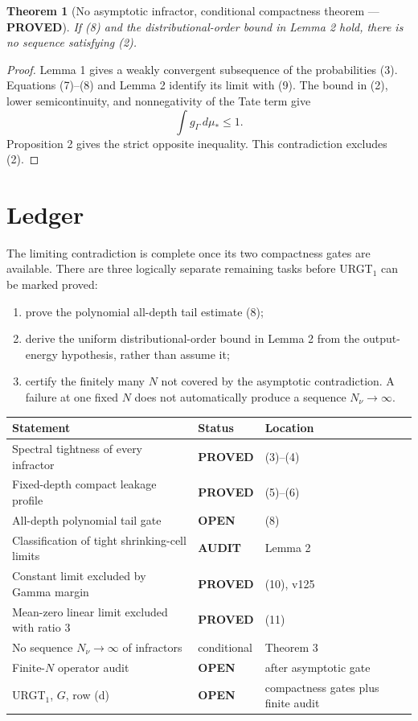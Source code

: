 \documentclass[11pt]{article}
\newcommand{\PROVED}{\textcolor{green!40!black}{\textbf{PROVED}}}
\newcommand{\OPEN}{\textcolor{red!70!black}{\textbf{OPEN}}}
\newcommand{\AUDIT}{\textcolor{orange!70!black}{\textbf{AUDIT}}}
\newtheorem{theorem}{Theorem}
\begin{document}
\begin{theorem}[No asymptotic infractor, conditional compactness theorem
--- \PROVED]
If (8) and the distributional-order bound in Lemma 2 hold, there is no
sequence satisfying (2).
\end{theorem}

\begin{proof}
Lemma 1 gives a weakly convergent subsequence of the probabilities (3).
Equations (7)--(8) and Lemma 2 identify its limit with (9).
The bound in (2), lower semicontinuity, and nonnegativity of the Tate term
give
\[
                         \int g_\Gamma\,d\mu_*\le1.
\]
Proposition 2 gives the strict opposite inequality.  This contradiction
excludes (2).
\end{proof}

\section{Ledger}

The limiting contradiction is complete once its two compactness gates are
available.  There are three logically separate remaining tasks before
URGT$_1$ can be marked proved:
\begin{enumerate}
 \item prove the polynomial all-depth tail estimate (8);
 \item derive the uniform distributional-order bound in Lemma 2 from the
       output-energy hypothesis, rather than assume it;
 \item certify the finitely many $N$ not covered by the asymptotic
       contradiction.  A failure at one fixed $N$ does not automatically
       produce a sequence $N_\nu\to\infty$.
\end{enumerate}

\begin{center}
\begin{tabular}{>{\raggedright\arraybackslash}p{.57\linewidth}
                >{\centering\arraybackslash}p{.14\linewidth}
                >{\raggedright\arraybackslash}p{.19\linewidth}}
\toprule
Statement & Status & Location \\
\midrule
Spectral tightness of every infractor & \PROVED & (3)--(4) \\
Fixed-depth compact leakage profile & \PROVED & (5)--(6) \\
All-depth polynomial tail gate & \OPEN & (8) \\
Classification of tight shrinking-cell limits & \AUDIT & Lemma 2 \\
Constant limit excluded by Gamma margin & \PROVED & (10), v125 \\
Mean-zero linear limit excluded with ratio $3$ & \PROVED & (11) \\
No sequence $N_\nu\to\infty$ of infractors & conditional & Theorem 3 \\
Finite-$N$ operator audit & \OPEN & after asymptotic gate \\
URGT$_1$, $G$, row (d) & \OPEN & compactness gates plus finite audit \\
\bottomrule
\end{tabular}
\end{center}
\end{document}
